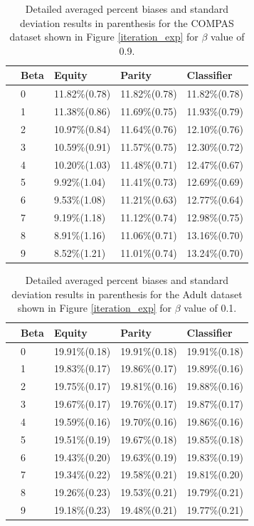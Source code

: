\begin{table}[h]
\begin{tabular}{  c p{0.5cm} p{1.7cm} p{1.7cm} p{1.7cm}}
 \toprule
& \textbf{Beta} & \textbf{Equity} &\textbf{Parity}&\textbf{Classifier}\\
 \midrule
 \parbox[t]{2mm}{} & 
 0&11.82\%(0.78)& 11.82\%(0.78)&11.82\%(0.78)\\[1pt]
   &1&11.38\%(0.86)& 11.69\%(0.75)&11.93\%(0.79)\\[1pt]
   &2&10.97\%(0.84)& 11.64\%(0.76)&12.10\%(0.76)\\[1pt]
   &3&10.59\%(0.91)& 11.57\%(0.75)&12.30\%(0.72)\\[1pt]
   &4&10.20\%(1.03)&11.48\%(0.71) &12.47\%(0.67)\\[1pt]
 & 5&9.92\%(1.04)& 11.41\%(0.73)&12.69\%(0.69)\\[1pt]
 &6&9.53\%(1.08)& 11.21\%(0.63)&12.77\%(0.64)\\[1pt]
 &7&9.19\%(1.18)& 11.12\%(0.74)&12.98\%(0.75)\\[1pt]
 &8&8.91\%(1.16)&11.06\%(0.71) &13.16\%(0.70)\\[1pt]
  &9&8.52\%(1.21)&11.01\%(0.74) &13.24\%(0.70)\\[1pt]
 \bottomrule
\end{tabular}
\caption{Detailed averaged percent biases and standard deviation results in parenthesis for the COMPAS dataset shown in Figure \ref{iteration_exp} for $\beta$ value of 0.9.}
\label{compas_feed_0.9}
\end{table}


\begin{table}[h]
\begin{tabular}{  c p{0.5cm} p{1.7cm} p{1.7cm} p{1.7cm}}
 \toprule
& \textbf{Beta} & \textbf{Equity} &\textbf{Parity}&\textbf{Classifier}\\
 \midrule
 \parbox[t]{2mm}{} & 
 0&19.91\%(0.18)&19.91\%(0.18) &19.91\%(0.18)\\[1pt]
   &1&19.83\%(0.17)&19.86\%(0.17) &19.89\%(0.16)\\[1pt]
   &2&19.75\%(0.17)& 19.81\%(0.16)&19.88\%(0.16)\\[1pt]
   &3&19.67\%(0.17)& 19.76\%(0.17)&19.87\%(0.17)\\[1pt]
   &4&19.59\%(0.16)&19.70\%(0.16) &19.86\%(0.16)\\[1pt]
 & 5&19.51\%(0.19)&19.67\%(0.18) &19.85\%(0.18)\\[1pt]
 &6&19.43\%(0.20)&19.63\%(0.19) &19.83\%(0.19)\\[1pt]
 &7&19.34\%(0.22)&19.58\%(0.21) &19.81\%(0.20)\\[1pt]
 &8&19.26\%(0.23)&19.53\%(0.21) &19.79\%(0.21)\\[1pt]
  &9&19.18\%(0.23)&19.48\%(0.21)&19.77\%(0.21)\\[1pt]
 \bottomrule
\end{tabular}
\caption{Detailed averaged percent biases and standard deviation results in parenthesis for the Adult dataset shown in Figure \ref{iteration_exp} for $\beta$ value of 0.1.}
\label{adult_feed_0.1}
\end{table}


